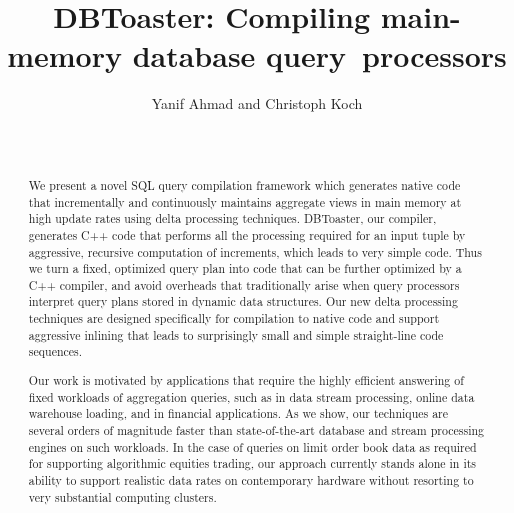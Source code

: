 \documentclass{vldb}
\title{DBToaster: Compiling main-memory database query~processors}
\author{
\alignauthor Yanif Ahmad and Christoph Koch \\
\affaddr{Department of Computer Science} \\
\affaddr{Cornell University, Ithaca, NY} \\
\email{\{yanif, koch\}@cs.cornell.edu}}
\date{}
\begin{document}
\maketitle


\begin{abstract}
We  present a novel  SQL query  compilation framework  which generates native 
code that incrementally  and continuously  maintains aggregate views  in main 
memory at  high  update rates  using delta  processing techniques. DBToaster, 
our compiler, generates C++  code that  performs all the  processing required 
for an input  tuple by aggressive, recursive computation of increments, which leads to very simple code. Thus we turn  a fixed,
optimized query plan into code that can be further optimized by a C++ compiler,
and avoid overheads that traditionally arise when query processors interpret
query plans stored in dynamic data structures. Our new delta processing
techniques are designed specifically for compilation to native code and support
aggressive inlining that leads to surprisingly small and simple straight-line
code sequences.

Our  work  is  motivated  by  applications  that  require  the  highly
efficient answering of fixed workloads of aggregation queries, such as
in  data stream  processing,  online data  warehouse  loading, and  in
financial applications. As we  show, our techniques are several orders
of  magnitude   faster  than  state-of-the-art   database  and  stream
processing engines on such workloads.  In the case of queries on limit
order  book  data  as  required for  supporting  algorithmic  equities
trading, our approach currently stands alone in its ability to support
realistic  data rates  on contemporary  hardware without  resorting to
very substantial computing clusters.
\end{abstract}










\small{


}
\end{document}
